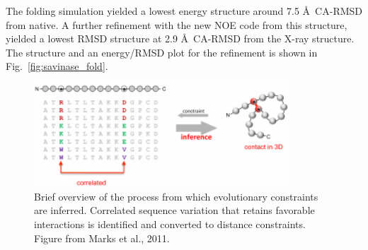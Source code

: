 The folding simulation yielded a lowest energy structure around 7.5 \AA~CA-RMSD from native. A further refinement with the new NOE code from this structure, yielded a lowest RMSD structure at 2.9 \AA~CA-RMSD from the X-ray structure.
The structure and an energy/RMSD plot for the refinement is shown in Fig.~\ref{fig:savinase_fold}.

\begin{figure}
    \includegraphics[width=0.85\textwidth]{figures/evo_constraint.pdf}
    \caption{Brief overview of the process from which evolutionary constraints are inferred. Correlated sequence variation that retains favorable interactions is identified and converted to distance constraints. Figure from Marks et al., 2011.}
    \label{fig:evo_constraint}
\end{figure}





% 
% 

